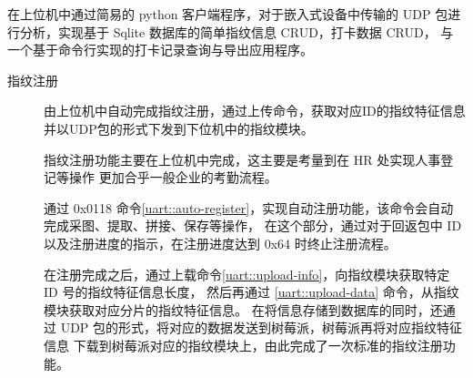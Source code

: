     在上位机中通过简易的 python 客户端程序，对于嵌入式设备中传输的 UDP 包进行分析，实现基于 Sqlite 数据库的简单指纹信息 CRUD，打卡数据 CRUD，
    与一个基于命令行实现的打卡记录查询与导出应用程序。

    \begin{description}
        \item[指纹注册] 由上位机中自动完成指纹注册，通过上传命令，获取对应ID的指纹特征信息并以UDP包的形式下发到下位机中的指纹模块。
        
        指纹注册功能主要在上位机中完成，这主要是考量到在 HR 处实现人事登记等操作
        更加合乎一般企业的考勤流程。
        
        通过 0x0118 命令\ref{uart::auto-register}，实现自动注册功能，该命令会自动完成采图、提取、拼接、保存等操作，
        在这个部分，通过对于回返包中 ID 以及注册进度的指示，在注册进度达到 0x64 时终止注册流程。

        \begin{table}[htbp]
            \caption{自动注册命令用户层帧} \label{uart::auto-register}
        \end{table}

        在注册完成之后，通过上载命令\ref{uart::upload-info}，向指纹模块获取特定 ID 号的指纹特征信息长度，
        然后再通过 \ref{uart::upload-data} 命令，从指纹模块获取对应分片的指纹特征信息。
        在将信息存储到数据库的同时，还通过 UDP 包的形式，将对应的数据发送到树莓派，树莓派再将对应指纹特征信息
        下载到树莓派对应的指纹模块上，由此完成了一次标准的指纹注册功能。

        \begin{table}[htbp]
             \caption{获取上传信息命令用户层帧} \label{uart::upload-info}
        \end{table}


\end{description}
